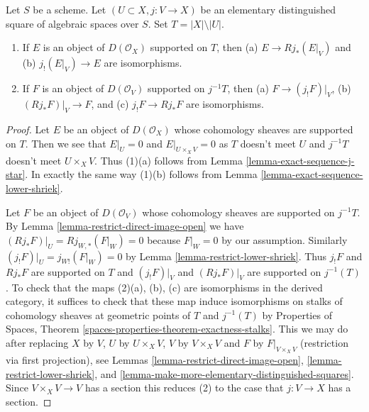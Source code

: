 \begin{lemma}
\label{lemma-pushforward-with-support-in-open}
Let $S$ be a scheme. Let $(U \subset X, j : V \to X)$ be an elementary
distinguished square of algebraic spaces over $S$. Set
$T = |X| \setminus |U|$.
\begin{enumerate}
\item If $E$ is an object of $D(\mathcal{O}_X)$ supported on $T$, then
(a) $E \to Rj_*(E|_V)$ and (b) $j_!(E|_V) \to E$ are isomorphisms.
\item If $F$ is an object of $D(\mathcal{O}_V)$ supported on $j^{-1}T$, then
(a) $F \to (j_!F)|_V$, (b) $(Rj_*F)|_V \to F$, and (c)
$j_!F \to Rj_*F$ are isomorphisms.
\end{enumerate}
\end{lemma}

\begin{proof}
Let $E$ be an object of $D(\mathcal{O}_X)$ whose cohomology sheaves are
supported on $T$. Then we see that $E|_U = 0$ and $E|_{U \times_X V} = 0$
as $T$ doesn't meet $U$ and $j^{-1}T$ doesn't meet $U \times_X V$.
Thus (1)(a) follows from Lemma \ref{lemma-exact-sequence-j-star}.
In exactly the same way (1)(b) follows from
Lemma \ref{lemma-exact-sequence-lower-shriek}.

\medskip\noindent
Let $F$ be an object of $D(\mathcal{O}_V)$ whose cohomology sheaves
are supported on $j^{-1}T$. By
Lemma \ref{lemma-restrict-direct-image-open} we have
$(Rj_*F)|_U = Rj_{W, *}(F|_W) = 0$ because $F|_W = 0$ by our assumption.
Similarly $(j_!F)|_U = j_{W!}(F|_W) = 0$ by
Lemma \ref{lemma-restrict-lower-shriek}.
Thus $j_!F$ and $Rj_*F$ are
supported on $T$ and $(j_!F)|_V$ and $(Rj_*F)|_V$ are supported on
$j^{-1}(T)$. To check that the maps (2)(a), (b), (c) are isomorphisms
in the derived category, it suffices to check that these map induce
isomorphisms on stalks of cohomology sheaves at geometric points of $T$
and $j^{-1}(T)$ by
Properties of Spaces, Theorem
\ref{spaces-properties-theorem-exactness-stalks}.
This we may do after replacing $X$ by $V$, $U$ by $U \times_X V$,
$V$ by $V \times_X V$ and $F$ by $F|_{V \times_X V}$ (restriction via
first projection), see
Lemmas \ref{lemma-restrict-direct-image-open},
\ref{lemma-restrict-lower-shriek}, and
\ref{lemma-make-more-elementary-distinguished-squares}.
Since $V \times_X V \to V$ has a section this
reduces (2) to the case that $j : V \to X$ has a section.


\end{proof}
